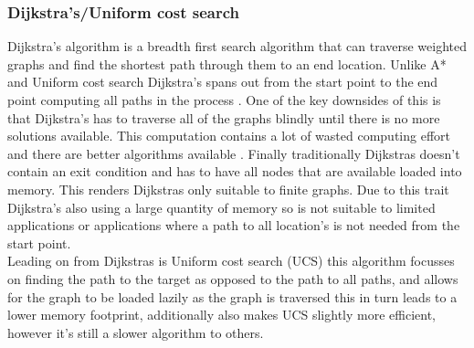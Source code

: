 \subsubsection{Dijkstra's/Uniform cost search}
Dijkstra’s algorithm is a breadth first search algorithm that can traverse weighted graphs and find the shortest path through them to an end location. Unlike A* and Uniform cost search Dijkstra’s spans out from the start point to the end point computing all paths in the process \citetemp. One of the key downsides of this is that Dijkstra’s has to traverse all of the graphs blindly until there is no more solutions available. This computation contains a lot of wasted computing effort and there are better algorithms available \citetemp. Finally traditionally Dijkstras doesn't contain an exit condition and has to have all nodes that are available loaded into memory. This renders Dijkstras only suitable to finite graphs. Due to this trait Dijkstra's also using a large quantity of memory so is not suitable to limited applications or applications where a path to all location's is not needed from the start point.\\
Leading on from Dijkstras is Uniform cost search (UCS) this algorithm focusses on finding the path to the target as opposed to the path to all paths, and allows for the graph to be loaded lazily as the graph is traversed this in turn leads to a lower memory footprint, additionally also makes UCS slightly more efficient, however it's still a slower algorithm to others.